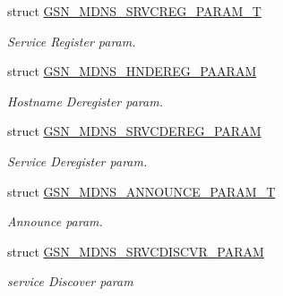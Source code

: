 \begin{DoxyCompactItemize}
struct \hyperlink{a00149}{GSN\_\-MDNS\_\-SRVCREG\_\-PARAM\_\-T}
\begin{DoxyCompactList}\small\item\em Service Register param. \end{DoxyCompactList}\item 
struct \hyperlink{a00142}{GSN\_\-MDNS\_\-HNDEREG\_\-PAARAM}
\begin{DoxyCompactList}\small\item\em Hostname Deregister param. \end{DoxyCompactList}\item 
struct \hyperlink{a00147}{GSN\_\-MDNS\_\-SRVCDEREG\_\-PARAM}
\begin{DoxyCompactList}\small\item\em Service Deregister param. \end{DoxyCompactList}\item 
struct \hyperlink{a00141}{GSN\_\-MDNS\_\-ANNOUNCE\_\-PARAM\_\-T}
\begin{DoxyCompactList}\small\item\em Announce param. \end{DoxyCompactList}\item 
struct \hyperlink{a00148}{GSN\_\-MDNS\_\-SRVCDISCVR\_\-PARAM}
\begin{DoxyCompactList}\small\item\em service Discover param \end{DoxyCompactList}\end{DoxyCompactItemize}
